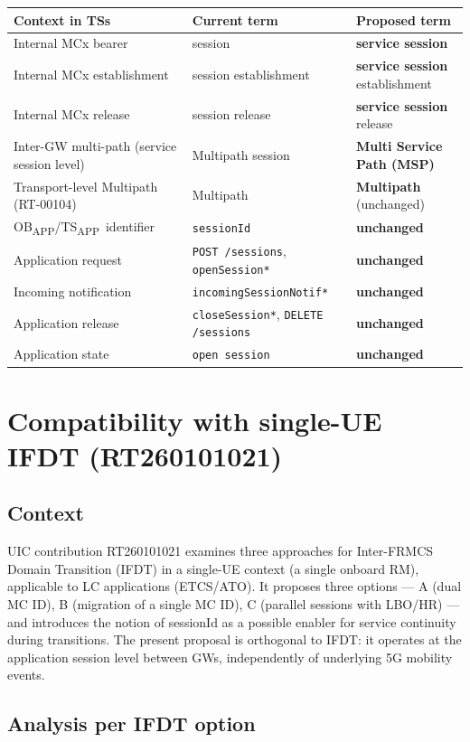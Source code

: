 \documentclass[11pt,a4paper]{article}
\newcommand{\OBAPP}{OB\textsubscript{APP}}
\newcommand{\TSAPP}{TS\textsubscript{APP}}
\begin{document}
\begin{longtable}{p{5.5cm} p{4cm} p{4.5cm}}
  \toprule Context in TSs & Current term & Proposed term \\ \midrule \endhead
  Internal MCx bearer & session & \textbf{service session} \\
  Internal MCx establishment & session establishment & \textbf{service session} establishment \\
  Internal MCx release & session release & \textbf{service session} release \\
  Inter-GW multi-path (service session level) & Multipath session & \textbf{Multi Service Path (MSP)} \\
  Transport-level Multipath (RT-00104) & Multipath & \textbf{Multipath} (unchanged) \\
  \OBAPP/\TSAPP\ identifier & \texttt{sessionId} & \textbf{unchanged} \\
  Application request & \texttt{POST /sessions}, \texttt{openSession*} & \textbf{unchanged} \\
  Incoming notification & \texttt{incomingSessionNotif*} & \textbf{unchanged} \\
  Application release & \texttt{closeSession*}, \texttt{DELETE /sessions} & \textbf{unchanged} \\
  Application state & \texttt{open session} & \textbf{unchanged} \\
  \bottomrule
\end{longtable}
\section{Compatibility with single-UE IFDT (RT260101021)}
\subsection{Context}
UIC contribution RT260101021 examines three approaches for Inter-FRMCS Domain Transition (IFDT) in a single-UE context (a single onboard RM), applicable to LC applications (ETCS/ATO). It proposes three options — A (dual MC ID), B (migration of a single MC ID), C (parallel sessions with LBO/HR) — and introduces the notion of sessionId as a possible enabler for service continuity during transitions.
The present proposal is orthogonal to IFDT: it operates at the application session level between GWs, independently of underlying 5G mobility events.
\subsection{Analysis per IFDT option}
\end{document}
